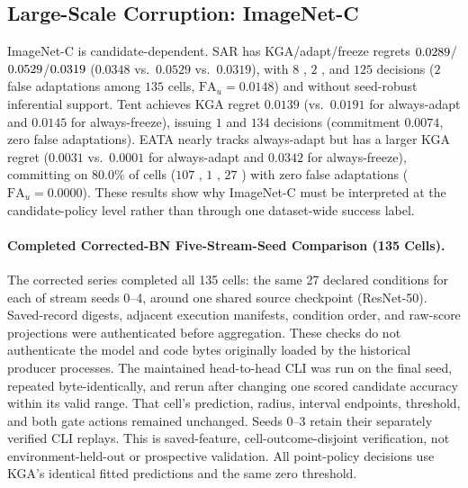 \subsection{Large-Scale Corruption: ImageNet-C}
\label{app:sar-official-controls}

ImageNet-C is candidate-dependent. SAR has KGA/adapt/freeze regrets
$0.0289$/$0.0529$/$0.0319$ ($0.0348$ vs.\ $0.0529$ vs.\ $0.0319$), with
$8$ \adapt, $2$ \freeze, and $125$ \abstain decisions ($2$ false adaptations among $135$ cells, $\mathrm{FA}_u = 0.0148$) and without seed-robust inferential support. Tent achieves KGA regret $0.0139$ (vs.\ $0.0191$ for always-adapt and $0.0145$ for always-freeze), issuing $1$ \adapt and $134$ \abstain decisions (commitment $0.0074$, zero false adaptations). EATA nearly
tracks always-adapt but has a larger KGA regret ($0.0031$ vs.\ $0.0001$ for always-adapt and $0.0342$ for always-freeze), committing on $80.0\%$ of cells ($107$ \adapt, $1$ \freeze, $27$ \abstain) with zero false adaptations ($\mathrm{FA}_u = 0.0000$). These results show why
ImageNet-C must be interpreted at the candidate-policy level rather than through one dataset-wide
success label.

\paragraph{Completed Corrected-BN Five-Stream-Seed Comparison (135 Cells).}
The corrected series completed all 135 cells: the same 27 declared conditions for each of stream
seeds 0--4, around one shared source checkpoint (ResNet-50). Saved-record digests, adjacent execution
manifests, condition order, and raw-score projections were authenticated before aggregation. These checks
do not authenticate the model and code bytes originally loaded by the historical producer processes.
The maintained head-to-head CLI was run on the final seed, repeated byte-identically, and rerun after
changing one scored candidate accuracy within its valid range. That cell's prediction, radius,
interval endpoints, threshold, and both gate actions remained unchanged. Seeds 0--3 retain their separately
verified CLI replays. This is saved-feature, cell-outcome-disjoint verification, not environment-held-out
or prospective validation. All point-policy decisions use KGA's identical fitted predictions and the same
zero threshold.

